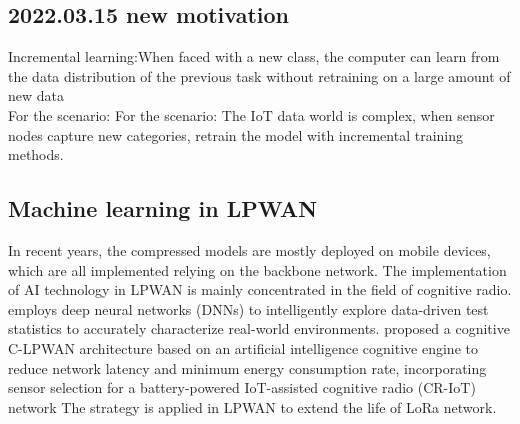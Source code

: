 \documentclass[conference]{IEEEtran}
\begin{document}
	\subsection{2022.03.15 new motivation}
	Incremental learning:When faced with a new class, the computer can learn from the data distribution of the previous task without retraining on a large amount of new data\\
	For the scenario:  For the scenario: The IoT data world is complex, when sensor nodes capture new categories, retrain the model with incremental training methods.
	\cite{RN216}\cite{rebuffi2017icarl} 
	
	\subsection{Machine learning in LPWAN}
	In recent years, the compressed models are mostly deployed on mobile devices,
	which are all implemented relying on the backbone network. The implementation of
	AI technology in LPWAN is mainly concentrated in the field of cognitive
	radio\cite{8972333}. \cite{8792213}employs deep neural networks (DNNs) to
	intelligently explore data-driven test statistics to accurately characterize
	real-world environments. \cite{8480446} proposed a cognitive C-LPWAN
	architecture based on an artificial intelligence cognitive engine to reduce
	network latency and minimum energy consumption rate, incorporating sensor
	selection for a battery-powered IoT-assisted cognitive radio (CR-IoT) network
	The strategy is applied in LPWAN to extend the life of LoRa network.
	
\end{document}

